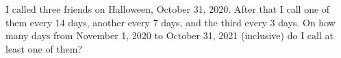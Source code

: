 I called three friends on Halloween, October 31, 2020. After that I call one of them every $14$ days, another every $7$ days, and the third every $3$ days. On how many days from November 1, 2020 to October 31, 2021 (inclusive) do I call at least one of them?
